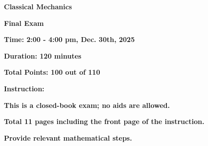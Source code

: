 \documentclass[11pt, a4paper]{article} %
\begin{document}
	
	
\setlength{\parindent}{0pt} %
\onehalfspacing				%



\vspace*{0.1cm}				%


\begin{center}
	{\Large \textbf{Classical Mechanics}}
    \vspace*{2mm}
    
    {\Large \textbf{Final Exam}}
	\vspace{8mm}

{\Large \bf \color{red} Time: 2:00 - 4:00 pm, Dec. 30th, 2025}
\vspace*{2mm}

{\Large \bf \color{red} Duration: 120 minutes}
\vspace*{2mm}

{\Large \bf \color{red} Total Points: 100 out of 110}
\end{center}
\vspace*{8mm}

{\Large \bf \color{orange} Instruction:} 
\vspace*{2mm}

{\Large \bf \color{orange} \hspace{2em} This is a closed-book exam; no aids are allowed.}
\vspace*{2mm}

{\Large \bf \color{orange} \hspace{2em} Total 11 pages including the front page of the instruction.}
\vspace*{2mm}

{\Large \bf \color{orange} \hspace{2em} Provide relevant mathematical steps.} 
\vspace*{2mm}
\end{document}
